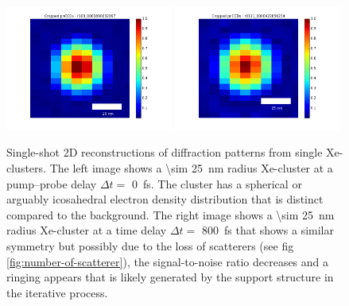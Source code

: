 %
%
%
%
%
\begin{figure}
	\centering
		\includegraphics[width=0.49\textwidth]{images/results/Xe_0_fs.png}
		\includegraphics[width=0.49\textwidth]{images/results/Xe_800_fs.png}
	\caption[Single-shot 2D reconstructions of \SI{\sim 25}{\nano\meter} radius Xe-clusters.]{Single-shot 2D reconstructions of diffraction patterns from single Xe-clusters. The left image shows a \SI{\sim 25}{\nano\meter} radius Xe-cluster at a pump--probe delay $\Delta t=$ \SI{0}{\femto\second}. The cluster has a spherical or arguably icosahedral electron density distribution that is distinct compared to the background. The right image shows a \SI{\sim 25}{\nano\meter} radius Xe-cluster at a time delay $\Delta t=$ \SI{800}{\femto\second} that shows a similar symmetry but possibly due to the loss of scatterers (see fig \ref{fig:number-of-scatterer}), the signal-to-noise ratio decreases and a ringing appears that is likely generated by the support structure in the iterative process.}
	\label{fig:Xe-2D-reconstructions}
\end{figure}
